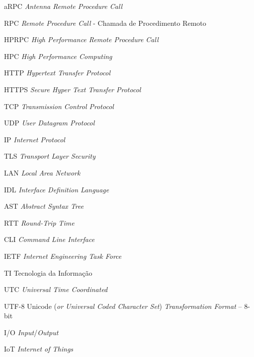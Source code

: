 \begin{siglas}

    \item [aRPC] \textit{Antenna Remote Procedure Call}
    \item [RPC] \textit{Remote Procedure Call} - Chamada de Procedimento Remoto
	\item [HPRPC] \textit{High Performance Remote Procedure Call}

    \item [HPC] \textit{High Performance Computing }

	\item [HTTP] \textit{Hypertext Transfer Protocol}
	\item [HTTPS] \textit{Secure Hyper Text Transfer Protocol}
	\item [TCP] \textit{Transmission Control Protocol}
	\item [UDP] \textit{User Datagram Protocol}
	\item [IP] \textit{Internet Protocol}
	\item [TLS] \textit{Transport Layer Security}
	\item [LAN] \textit{Local Area Network}

	\item [IDL] \textit{Interface Definition Language}
	\item [AST] \textit{Abstract Syntax Tree}
	\item [RTT] \textit{Round-Trip Time}
	\item [CLI] \textit{Command Line Interface}

	\item [IETF] \textit{Internet Engineering Task Force}
	\item [TI] Tecnologia da Informação
	
	\item[UTC] \textit{Universal Time Coordinated}
	
	\item [UTF-8] Unicode (\textit{or Universal Coded Character Set}) \textit{Transformation Format} – 8-bit
	
	\item [I/O] \textit{Input}/\textit{Output}
	
	\item [IoT] \textit{Internet of Things}
\end{siglas}
